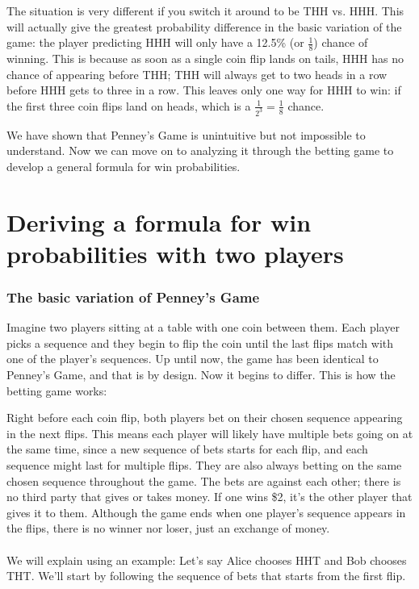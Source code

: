 \documentclass[english,12pt,a4paper,final]{article}
\begin{document}
The situation is very different if you switch it around to be THH vs. HHH. This will actually give the greatest probability difference in the basic variation of the game: the player predicting HHH will only have a 12.5\% (or $\frac{1}{8}$) chance of winning. This is because as soon as a single coin flip lands on tails, HHH has no chance of appearing before THH; THH will always get to two heads in a row before HHH gets to three in a row. This leaves only one way for HHH to win: if the first three coin flips land on heads, which is a $\frac{1}{2^3} = \frac{1}{8}$ chance.

We have shown that Penney's Game is unintuitive but not impossible to understand. Now we can move on to analyzing it through the betting game to develop a general formula for win probabilities.

\part{Deriving a formula for win probabilities with two players}\label{derivingFormula2P}

\section{The basic variation of Penney's Game}

Imagine two players sitting at a table with one coin between them. Each player picks a sequence and they begin to flip the coin until the last flips match with one of the player's sequences. Up until now, the game has been identical to Penney's Game, and that is by design. Now it begins to differ. This is how the betting game works:

Right before each coin flip, both players bet on their chosen sequence appearing in the next flips. This means each player will likely have multiple bets going on at the same time, since a new sequence of bets starts for each flip, and each sequence might last for multiple flips. They are also always betting on the same chosen sequence throughout the game. The bets are against each other; there is no third party that gives or takes money. If one wins \$2, it's the other player that gives it to them. Although the game ends when one player's sequence appears in the flips, there is no winner nor loser, just an exchange of money.
\\\\
We will explain using an example: Let's say Alice chooses HHT and Bob chooses THT. We'll start by following the sequence of bets that starts from the first flip. 
\end{document}
